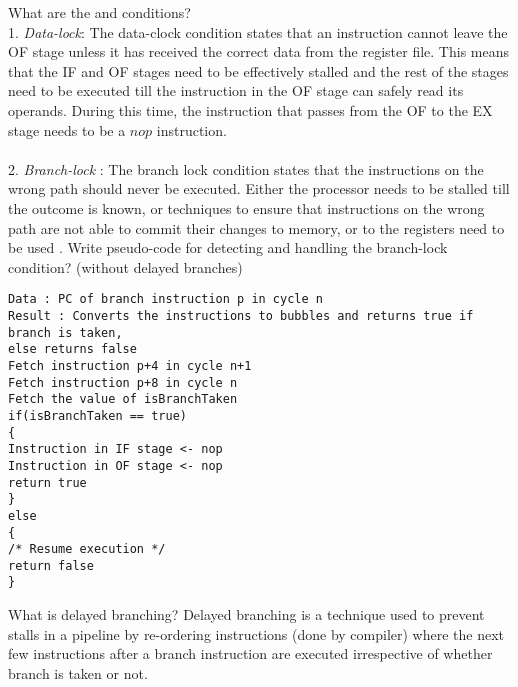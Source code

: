 \begin{ExerciseList}
\Exercise
What are the \datalock and \branchlock conditions?
\Answer
\hspace{1mm} \\ 
1. \textit{Data-lock}: The data-clock condition states that an instruction cannot leave the OF stage unless it has received the correct data from the register file. This means that the IF and OF stages need to be effectively stalled and the rest of the stages need to be executed till the instruction in the OF stage can safely read its operands. During this time, the instruction that passes from the OF to the EX stage needs to be a $nop$ instruction. \\ \\
2. \textit{Branch-lock} : The branch lock condition states that the instructions on the wrong path should never be executed. Either the processor needs to be stalled till the outcome is known, or techniques to ensure that instructions on the wrong path are not able to commit their changes to memory, or to the registers need to be used .
\Exercise
Write pseudo-code for detecting and handling the branch-lock condition? (without delayed branches) 
\Answer
\hspace{1mm} \\
\begin{Verbatim}
Data : PC of branch instruction p in cycle n 
Result : Converts the instructions to bubbles and returns true if branch is taken, 
else returns false 
Fetch instruction p+4 in cycle n+1
Fetch instruction p+8 in cycle n
Fetch the value of isBranchTaken 
if(isBranchTaken == true) 
{
Instruction in IF stage <- nop
Instruction in OF stage <- nop
return true 
} 
else 
{ 
/* Resume execution */ 
return false
}
\end{Verbatim} 
\Exercise
What is delayed branching?
\Answer
Delayed branching is a technique used to prevent stalls in a pipeline by re-ordering instructions (done by compiler) where the next few 
instructions after a branch instruction are executed irrespective of whether branch is taken or not.


\end{ExerciseList}
